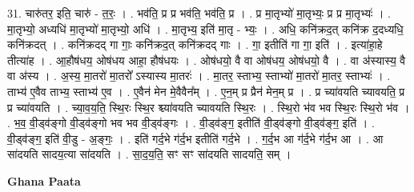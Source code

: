 \documentclass[17pt]{extarticle}
\begin{document}
31. चारु॑तर॒ इति॒ चारु॑ - त॒रः॒ । . भव॑ति॒ प्र प्र भव॑ति॒ भव॑ति॒ प्र । . प्र मा॒तृभ्यो॑ मा॒तृभ्यः॒ प्र प्र मा॒तृभ्यः॑ । . मा॒तृभ्यो॒ अध्यधि॑ मा॒तृभ्यो॑ मा॒तृभ्यो॒ अधि॑ । . मा॒तृभ्य॒ इति॑ मा॒तृ - भ्यः॒ । . अधि॒ कनि॑क्रद॒त् कनि॑क्र द॒दध्यधि॒ कनि॑क्रदत् । . कनि॑क्रदद् गा गाः॒ कनि॑क्रद॒त् कनि॑क्रदद् गाः । . गा॒ इतीति॑ गा गा॒ इति॑ । . इत्या॑हा॒हे तीत्या॑ह । . आ॒हौष॑धय॒ ओष॑धय आहा॒ हौष॑धयः । . ओष॑धयो॒ वै वा ओष॑धय॒ ओष॑धयो॒ वै । . वा अ॑स्यास्य॒ वै वा अ॑स्य । . अ॒स्य॒ मा॒तरो॑ मा॒तरो᳚ ऽस्यास्य मा॒तरः॑ । . मा॒तर॒ स्ताभ्य॒ स्ताभ्यो॑ मा॒तरो॑ मा॒तर॒ स्ताभ्यः॑ । . ताभ्य॑ ए॒वैव ताभ्य॒ स्ताभ्य॑ ए॒व । . ए॒वैन॑ मेन मे॒वैवैन᳚म् । . ए॒न॒म् प्र प्रैन॑ मेन॒म् प्र । . प्र च्या॑वयति च्यावयति॒ प्र प्र च्या॑वयति । . च्या॒व॒य॒ति॒ स्थि॒रः स्थि॒र श्च्या॑वयति च्यावयति स्थि॒रः । . स्थि॒रो भ॑व भव स्थि॒रः स्थि॒रो भ॑व । . भ॒व॒ वी॒ड्व॑ङ्गो वी॒ड्व॑ङ्गो भव भव वी॒ड्व॑ङ्गः । . वी॒ड्व॑ङ्ग॒ इतीति॑ वी॒ड्व॑ङ्गो वी॒ड्व॑ङ्ग॒ इति॑ । . वी॒ड्व॑ङ्ग॒ इति॑ वी॒डु - अ॒ङ्गः॒ । . इति॑ गर्द॒भे ग॑र्द॒भ इतीति॑ गर्द॒भे । . ग॒र्द॒भ आ ग॑र्द॒भे ग॑र्द॒भ आ । . आ सा॑दयति सादय॒त्या सा॑दयति । . सा॒द॒य॒ति॒ सꣳ सꣳ सा॑दयति सादयति॒ सम् । \newline

\textbf{Ghana Paata } \newline
\end{document}
